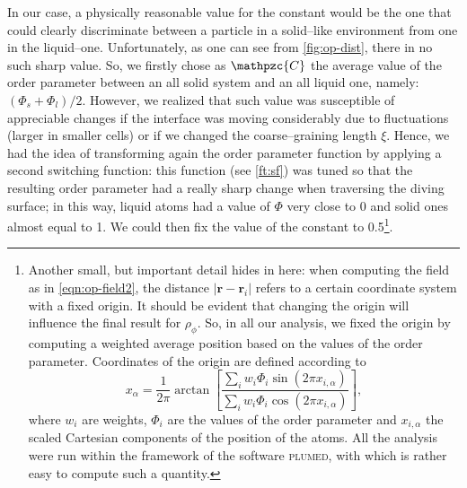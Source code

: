 In our case, a physically reasonable value for the constant would be the one that could clearly discriminate between a particle in a solid--like environment from one in the liquid--one. Unfortunately, as one can see from \cref{fig:op-dist}, there in no such sharp value. So, we firstly chose as $\mathpzc{C}$ the average value of the order parameter between an all solid system and an all liquid one, namely: $(\Phi_s+\Phi_l)/2$. However, we realized that such value was susceptible of appreciable changes if the interface was moving considerably due to fluctuations (larger in smaller cells) or if we changed the coarse--graining length $\xi$. Hence, we had the idea of transforming again the order parameter function by applying a second switching function: this function (see \cref{ft:sf}) was tuned so that the resulting order parameter had a really sharp change when traversing the diving surface; in this way, liquid atoms had a value of $\Phi$ very close to 0 and solid ones almost equal to 1. We could then fix the value of the constant to 0.5\footnote{Another small, but important detail hides in here: when computing the field as in \cref{eqn:op-field2}, the distance $|\bm{r}-\bm{r}_i|$ refers to a certain coordinate system with a fixed origin. It should be evident that changing the origin will influence the final result for $\rho_{\phi}$. So, in all our analysis, we fixed the origin by computing a weighted average position based on the values of the order parameter. Coordinates of the origin are defined according to
\begin{equation*}
    x_\alpha = \frac{1}{2\pi} \arctan \left[ \frac{ \sum_i w_i \Phi_i \sin\left( 2\pi x_{i,\alpha} \right) }{ \sum_i w_i \Phi_i \cos\left( 2\pi x_{i,\alpha} \right) } \right],
\end{equation*}
where $w_i$ are weights, $\Phi_i$ are the values of the order parameter and $x_{i,\alpha}$ the scaled Cartesian components of the position of the atoms. 
All the analysis were run within the framework of the software \textsc{plumed}, with which is rather easy to compute such a quantity.}.




